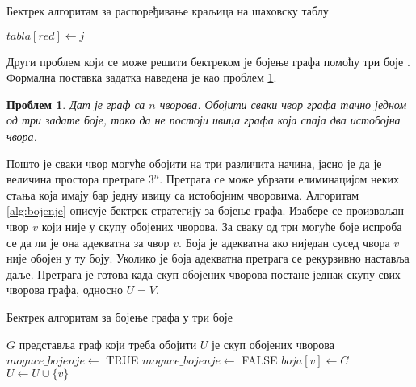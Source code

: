 \documentclass[a4paper, 12pt, ngerman]{article}
\newtheorem{problem}{Проблем}
\begin{document}
\begin{algorithm}[htbp]
\caption{Бектрек алгоритам за распоређивање краљица на шаховску таблу}
\label{alg:kraljice}
\begin{algorithmic}
		\State{} 
	\EndIf
			\Continue
		\EndIf
			\Continue
		\EndIf
			\Continue
		\EndIf
		\State{}
		\State{}
		\State{}
		\State $tabla[red] \gets j$
		\State{}
		\State{}
		\State{}
		\State{}
		\EndFor
	\EndFunction
\end{algorithmic}
\end{algorithm}

Други проблем који се може решити бектреком је бојење графа помоћу три боје \cite{rebnam}. Формална поставка задатка наведена је као проблем \ref{prob:thregraphcolor}.

\begin{problem}
\label{prob:thregraphcolor}
Дат је граф са $n$ чворова. Обојити сваки чвор графа тачно једном од три задате боје, тако да не постоји ивица графа која спаја два истобојна чвора.
\end{problem}

Пошто је сваки чвор могуће обојити на три различита начина, јасно је да је величина простора претраге $3^n$. Претрага се може убрзати елиминацијом неких стaња која имају бар једну ивицу са истобојним чворовима. Алгоритам \ref{alg:bojenje} описује бектрек стратегију за бојење графа. Изабере се произвољан чвор $v$ који није у скупу обојених чворова. За сваку од три могуће боје испроба се да ли је она адекватна за чвор $v$. Боја је адекватна ако ниједан сусед чвора $v$ није обојен у ту боју. Уколико је боја адекватна претрага се рекурзивно наставља даље. Претрага је готова када скуп обојених чворова постане једнак скупу свих чворова графа, односно $U = V$.

\begin{algorithm}[htbp]
	\caption{Бектрек алгоритам за бојење графа у три боје}
	\label{alg:bojenje}
	\begin{algorithmic}
		\Comment $G$ представља граф који треба обојити
		\State\Comment $U$ је скуп обојених чворова
			\State{}
		\EndFor
		\State\Return
		\EndIf
				\Break
			\EndIf
		\EndFor
			\State $moguce\_bojenje \gets$ TRUE
					\State $moguce\_bojenje \gets$ FALSE
					\Break
				\EndIf
			\EndFor
				\State $boja[v] \gets C$
				\State $U \gets U \cup \{v\}$
				\State{}
			\EndIf
		\EndFor
		\EndFunction
	\end{algorithmic}
\end{algorithm}
\end{document}
